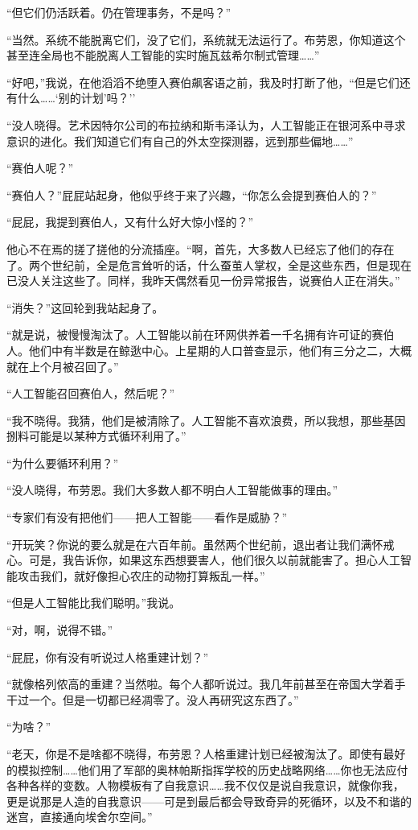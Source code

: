 \documentclass[AutoFakeBold=true]{book}
\begin{document}
``但它们仍活跃着。仍在管理事务，不是吗？''

``当然。系统不能脱离它们，没了它们，系统就无法运行了。布劳恩，你知道这个甚至连全局也不能脱离人工智能的实时施瓦兹希尔制式管理……''

``好吧，''我说，在他滔滔不绝堕入赛伯飙客语之前，我及时打断了他，``但是它们还有什么……`别的计划'吗？''

``没人晓得。艺术因特尔公司的布拉纳和斯韦泽认为，人工智能正在银河系中寻求意识的进化。我们知道它们有自己的外太空探测器，远到那些偏地……''

``赛伯人呢？''

``赛伯人？''屁屁站起身，他似乎终于来了兴趣，``你怎么会提到赛伯人的？''

``屁屁，我提到赛伯人，又有什么好大惊小怪的？''

他心不在焉的搓了搓他的分流插座。``啊，首先，大多数人已经忘了他们的存在了。两个世纪前，全是危言耸听的话，什么蚕茧人掌权，全是这些东西，但是现在已没人关注这些了。同样，我昨天偶然看见一份异常报告，说赛伯人正在消失。''

``消失？''这回轮到我站起身了。

``就是说，被慢慢淘汰了。人工智能以前在环网供养着一千名拥有许可证的赛伯人。他们中有半数是在鲸逖中心。上星期的人口普查显示，他们有三分之二，大概就在上个月被召回了。''

``人工智能召回赛伯人，然后呢？''

``我不晓得。我猜，他们是被清除了。人工智能不喜欢浪费，所以我想，那些基因捌料可能是以某种方式循环利用了。''

``为什么要循环利用？''

``没人晓得，布劳恩。我们大多数人都不明白人工智能做事的理由。''

``专家们有没有把他们——把人工智能——看作是威胁？''

``开玩笑？你说的要么就是在六百年前。虽然两个世纪前，退出者让我们满怀戒心。可是，我告诉你，如果这东西想要害人，他们很久以前就能害了。担心人工智能攻击我们，就好像担心农庄的动物打算叛乱一样。''

``但是人工智能比我们聪明。''我说。

``对，啊，说得不错。''

``屁屁，你有没有听说过人格重建计划？''

``就像格列侬高的重建？当然啦。每个人都听说过。我几年前甚至在帝国大学着手干过一个。但是一切都已经凋零了。没人再研究这东西了。''

``为啥？''

``老天，你是不是啥都不晓得，布劳恩？人格重建计划已经被淘汰了。即使有最好的模拟控制……他们用了军部的奥林帕斯指挥学校的历史战略网络……你也无法应付各种各样的变数。人物模板有了自我意识……我不仅仅是说自我意识，就像你我，更是说那是人造的自我意识——可是到最后都会导致奇异的死循环，以及不和谐的迷宫，直接通向埃舍尔空间。''
\end{document}
